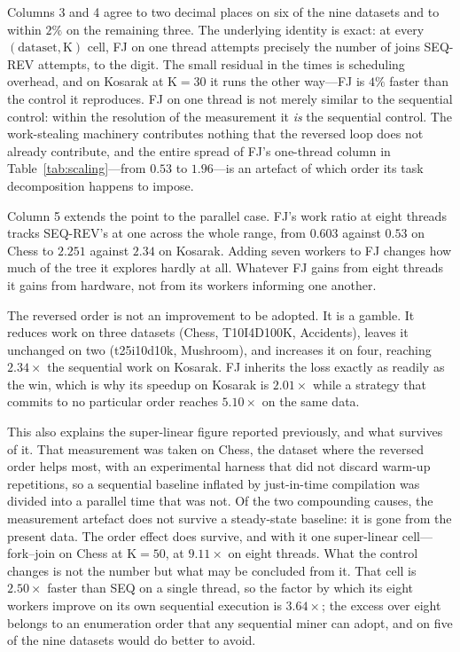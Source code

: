 \documentclass[pdflatex,sn-vancouver-num]{sn-jnl}
\theoremstyle{thmstyleone}%
\theoremstyle{thmstyletwo}%
\theoremstyle{thmstylethree}%
\newcommand{\Kk}{\mathrm{K}}
\begin{document}
Columns 3 and 4 agree to two decimal places on six of the nine datasets
and to within $2\%$ on the remaining three. The underlying identity is
exact: at every $(\text{dataset},\Kk)$ cell, FJ on one thread attempts
precisely the number of joins SEQ-REV attempts, to the digit. The small
residual in the times is scheduling overhead, and on Kosarak at
$\Kk=30$ it runs the other way---FJ is $4\%$ faster than the control it
reproduces. FJ on
one thread is not merely similar to the sequential control: within the
resolution of the measurement it \emph{is} the sequential control. The
work-stealing machinery contributes nothing that the reversed loop does
not already contribute, and the entire spread of FJ's one-thread column
in Table~\ref{tab:scaling}---from $0.53$ to $1.96$---is an artefact of
which order its task decomposition happens to impose.
 
Column 5 extends the point to the parallel case. FJ's work ratio at
eight threads tracks SEQ-REV's at one across the whole range, from
$0.603$ against $0.53$ on Chess to $2.251$ against $2.34$ on Kosarak.
Adding seven workers to FJ changes how much of the tree it explores
hardly at all. Whatever FJ gains from eight threads it gains from
hardware, not from its workers informing one another.
 
The reversed order is not an improvement to be adopted. It is a gamble.
It reduces work on three datasets (Chess, T10I4D100K, Accidents), leaves
it unchanged on two (t25i10d10k, Mushroom), and increases it on four,
reaching $2.34\times$ the sequential work on Kosarak. FJ inherits the
loss exactly as readily as the win, which is why its speedup on Kosarak
is $2.01\times$ while a strategy that commits to no particular order
reaches $5.10\times$ on the same data.
 

This also explains the super-linear figure reported previously, and what
survives of it. That measurement was taken on Chess, the dataset where
the reversed order helps most, with an experimental harness that did not
discard warm-up repetitions, so a sequential baseline inflated by
just-in-time compilation was divided into a parallel time that was not.
Of the two compounding causes, the measurement artefact does not survive
a steady-state baseline: it is gone from the present data. The order
effect does survive, and with it one super-linear cell---fork--join on
Chess at $\Kk=50$, at $9.11\times$ on eight threads. What the control
changes is not the number but what may be concluded from it. That cell
is $2.50\times$ faster than SEQ on a single thread, so the factor by
which its eight workers improve on its own sequential execution is
$3.64\times$; the excess over eight belongs to an enumeration order
that any sequential miner can adopt, and on five of the nine datasets
would do better to avoid.
 
\end{document}
